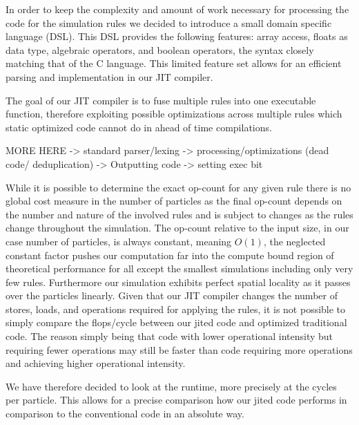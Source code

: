 In order to keep the complexity and amount of work necessary for processing the code for the simulation rules we decided to introduce a small domain specific language (DSL). This DSL provides the following features: array access, floats as data type, algebraic operators, and boolean operators, the syntax closely matching that of the C language. This limited feature set allows for an efficient parsing and implementation in our JIT compiler. 

The goal of our JIT compiler is to fuse multiple rules into one executable function, therefore exploiting possible optimizations across multiple rules which static optimized code cannot do in ahead of time compilations. 

MORE HERE
-> standard parser/lexing
-> processing/optimizations (dead code/ deduplication)
-> Outputting code
-> setting exec bit

While it is possible to determine the exact op-count for any given rule there is no global cost measure in the number of particles as the final op-count depends on the number and nature of the involved rules and is subject to changes as the rules change throughout the simulation. The op-count relative to the input size, in our case number of particles, is always constant, meaning $O(1)$, the neglected constant factor pushes our computation far into the compute bound region of theoretical performance for all except the smallest simulations including only very few rules. Furthermore our simulation exhibits perfect spatial locality as it passes over the particles linearly.
Given that our JIT compiler changes the number of stores, loads, and operations required for applying the rules, it is not possible to simply compare the flops/cycle between our jited code and optimized traditional code. The reason simply being that code with lower operational intensity but requiring fewer operations may still be faster than code requiring more operations and achieving higher operational intensity. 

We have therefore decided to look at the runtime, more precisely at the cycles per particle. This allows for a precise comparison how our jited code performs in comparison to the conventional code in an absolute way. 